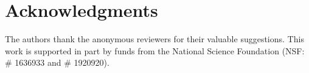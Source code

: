 \documentclass[unnumsec,webpdf,contemporary,large]{oup-authoring-template}%
\theoremstyle{thmstyleone}%
\theoremstyle{thmstyletwo}%
\theoremstyle{thmstylethree}%
\begin{document}





\section{Acknowledgments}
The authors thank the anonymous reviewers for their valuable suggestions. This work is supported in part by funds from the National Science Foundation (NSF: \# 1636933 and \# 1920920).
\cite{horvath2018dna}

%
% 
\end{document}
